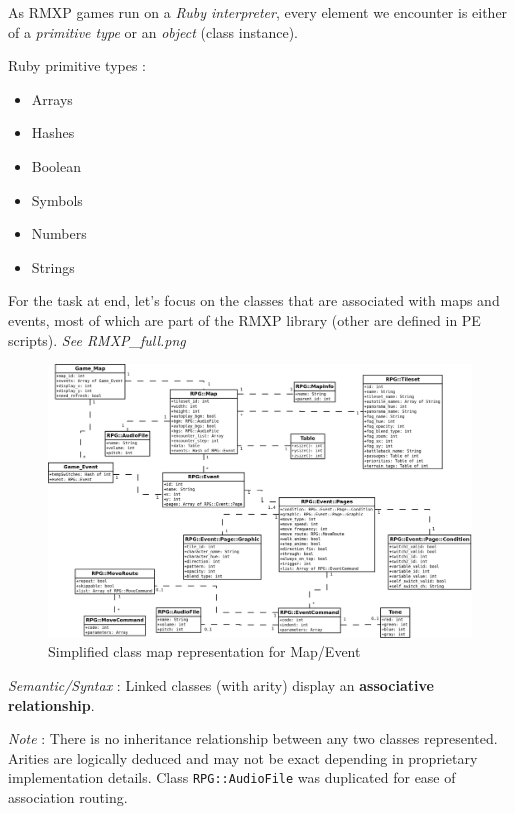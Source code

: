 \documentclass[11pt]{article}
\begin{document}
As RMXP games run on a \textit{Ruby interpreter}, every element we encounter is either of a \textit{primitive type} or an \textit{object} (class instance).

Ruby primitive types :
\begin{itemize}
	\item Arrays
	\item Hashes
	\item Boolean
	\item Symbols
	\item Numbers
	\item Strings
	
\end{itemize}

\vspace{2mm}
For the task at end, let's focus on the classes that are associated with maps and events, most of which are part of the RMXP library (other are defined in PE scripts). \textit{See RMXP\_full.png}

\begin{figure}[!h]
	\centering
	\includegraphics[width=\linewidth]{RMXP_full}
		\caption{Simplified class map representation for Map/Event}
	
\end{figure}


\textit{Semantic/Syntax} : Linked classes (with arity) display an \textbf{associative relationship}.

\textit{Note} : There is no inheritance relationship between any two classes represented. Arities are logically deduced and may not be exact depending in proprietary implementation details. Class \verb|RPG::AudioFile| was duplicated for ease of association routing.
\end{document}
